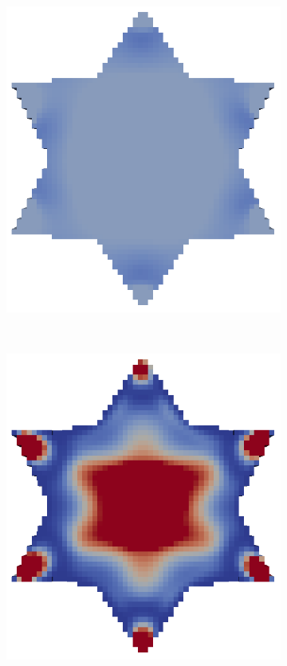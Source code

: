 \begin{figure}
\centering
\begin{subfigure}[c]{.2\linewidth}
\centering
  \includegraphics[width=.9\linewidth]{Pictures/TopOp/Star_Optimized0_Trans.png}
\end{subfigure}%
~
\begin{subfigure}[c]{.2\linewidth}
\centering
  \includegraphics[width=.9\linewidth]{Pictures/TopOp/Star_Optimized2_Trans.png}

\end{subfigure}
\end{figure}
